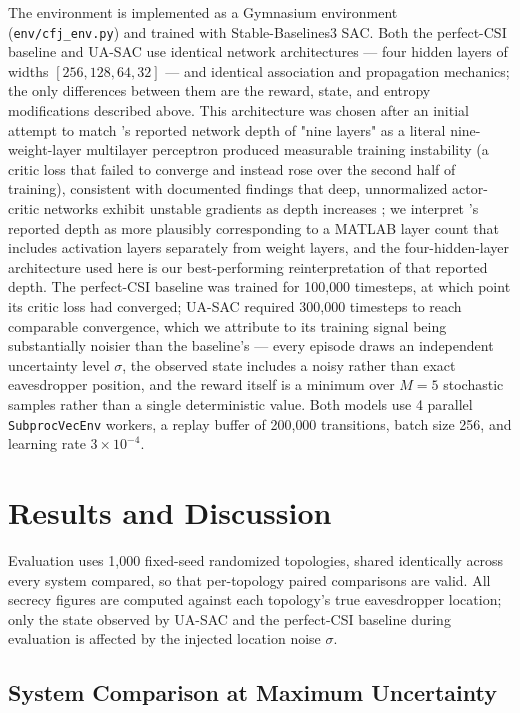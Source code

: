 \documentclass[conference]{IEEEtran}
\begin{document}
The environment is implemented as a Gymnasium environment (\texttt{env/cfj\_env.py}) and trained with Stable-Baselines3 SAC. Both the perfect-CSI baseline and UA-SAC use identical network architectures --- four hidden layers of widths $[256,128,64,32]$ --- and identical association and propagation mechanics; the only differences between them are the reward, state, and entropy modifications described above. This architecture was chosen after an initial attempt to match \cite{hoseini}'s reported network depth of "nine layers" as a literal nine-weight-layer multilayer perceptron produced measurable training instability (a critic loss that failed to converge and instead rose over the second half of training), consistent with documented findings that deep, unnormalized actor-critic networks exhibit unstable gradients as depth increases \cite{bjorck2021}; we interpret \cite{hoseini}'s reported depth as more plausibly corresponding to a MATLAB layer count that includes activation layers separately from weight layers, and the four-hidden-layer architecture used here is our best-performing reinterpretation of that reported depth. The perfect-CSI baseline was trained for 100{,}000 timesteps, at which point its critic loss had converged; UA-SAC required 300{,}000 timesteps to reach comparable convergence, which we attribute to its training signal being substantially noisier than the baseline's --- every episode draws an independent uncertainty level $\sigma$, the observed state includes a noisy rather than exact eavesdropper position, and the reward itself is a minimum over $M=5$ stochastic samples rather than a single deterministic value. Both models use 4 parallel \texttt{SubprocVecEnv} workers, a replay buffer of 200{,}000 transitions, batch size 256, and learning rate $3\times10^{-4}$.

\section{Results and Discussion}
\label{sec:results}

Evaluation uses 1{,}000 fixed-seed randomized topologies, shared identically across every system compared, so that per-topology paired comparisons are valid. All secrecy figures are computed against each topology's true eavesdropper location; only the state observed by UA-SAC and the perfect-CSI baseline during evaluation is affected by the injected location noise $\sigma$.

\subsection{System Comparison at Maximum Uncertainty}
\end{document}
